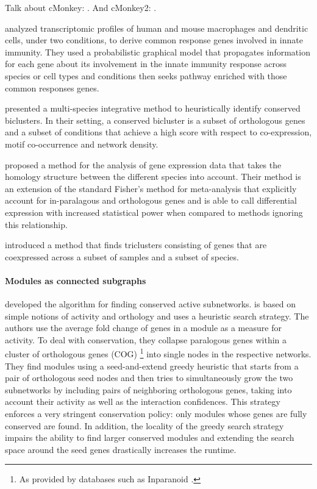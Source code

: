 	Talk about cMonkey: \parencite{reiss2006integrated}.
	And cMonkey2: \parencite{reiss2015cmonkey2}.

	\Textcite{lu2009cross} analyzed transcriptomic profiles of human and mouse macrophages and dendritic cells, under two conditions, to derive common response genes involved in innate immunity.
	They used a probabilistic graphical model that propagates information for each gene about its involvement in the innate immunity response across species or cell types and conditions then seeks pathway enriched with those common responses genes.

	\Textcite{waltman2010multi} presented a multi-species integrative method to heuristically identify conserved biclusters.
	In their setting, a conserved bicluster is a subset of orthologous genes and a subset of conditions that achieve a high score with respect to co-expression, motif co-occurrence and network density.

	\Textcite{kristiansson2013novel} proposed a method for the analysis of gene expression data that takes the homology structure between the different species into account.
	Their method is an extension of the standard Fisher's method for meta-analysis \parencites{hu2006statistical}{campain2010comparison}{tseng2012comprehensive} that explicitly account for in-paralagous and orthologous genes and is able to call differential expression with increased statistical power when compared to methods ignoring this relationship.

	\Textcite{dede2014triclust} introduced a method that finds triclusters consisting of genes that are coexpressed across a subset of samples and a subset of species.

	\paragraph{Modules as connected subgraphs}

	\Textcite{deshpande2010scalable} developed the \nexus{} algorithm for finding conserved active subnetworks.
	\nexus{} is based on simple notions of activity and orthology and uses a heuristic search strategy.
	The authors use the average fold change of genes in a module as a measure for activity.
	To deal with conservation, they collapse paralogous genes within a cluster of orthologous genes (COG) \parencite{tatusov1997genomic}\footnote{As provided by databases such as Inparanoid \parencite{obrien2005inparanoid}.} into single nodes in the respective networks.
	They find modules using a seed-and-extend greedy heuristic that starts from a pair of orthologous seed nodes and then tries to simultaneously grow the two subnetworks by including pairs of neighboring orthologous genes, taking into account their activity as well as the interaction confidences.
	This strategy enforces a very stringent conservation policy: only modules whose genes are fully conserved are found.
	In addition, the locality of the greedy search strategy impairs the ability to find larger conserved modules and extending the search space around the seed genes drastically increases the runtime.

